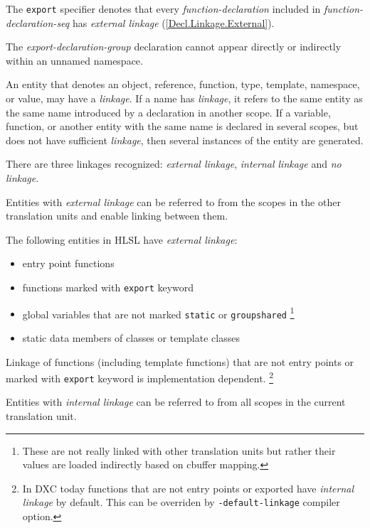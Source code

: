 \p The \texttt{export} specifier denotes that every \textit{function-declaration} included in \textit{function-declaration-seq} has \textit{external linkage} (\ref{Decl.Linkage.External}).

\p The \textit{export-declaration-group} declaration cannot appear directly or indirectly within an unnamed namespace.


\p An entity that denotes an object, reference, function, type, template, namespace, or value, may have a \textit{linkage}. If a name has \textit{linkage}, it refers to the same entity as the same name introduced by a declaration in another scope. If a variable, function, or another entity with the same name is declared in several scopes, but does not have sufficient \textit{linkage}, then several instances of the entity are generated.

\p There are three linkages recognized: \textit{external linkage}, \textit{internal linkage} and \textit{no linkage}.


\p Entities with \textit{external linkage} can be referred to from the scopes in the other translation units and enable linking between them.

\p The following entities in HLSL have \textit{external linkage}:
\begin{itemize}
  \item entry point functions
  \item functions marked with \texttt{export} keyword
  \item global variables that are not marked \texttt{static} or \texttt{groupshared} \footnote{These are not really linked with other translation units but rather their values are loaded indirectly based on cbuffer mapping.}
  \item static data members of classes or template classes
\end{itemize}

\p Linkage of functions (including template functions) that are not entry points or marked with \texttt{export} keyword is implementation dependent. \footnote{In DXC today functions that are not entry points or exported have \textit{internal linkage} by default. This can be overriden by \texttt{-default-linkage} compiler option.}


\p Entities with \textit{internal linkage} can be referred to from all scopes in the current translation unit.

